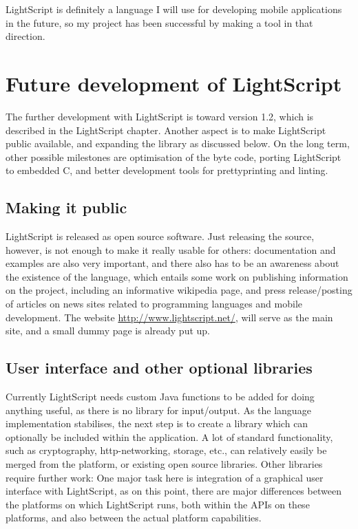 \documentclass[11pt]{report}
\begin{document}
LightScript is definitely a language I will use for developing mobile applications in the future, so my project has been successful by making a tool in that direction.

\section{Future development of LightScript}

The further development with LightScript is toward version 1.2, which is described in the LightScript chapter. Another aspect is to make LightScript public available, and expanding the library as discussed below.
On the long term, other possible milestones are optimisation of the byte code, porting LightScript to embedded C, and better development tools for prettyprinting and linting.

\subsection{Making it public}
LightScript is released as open source software. 
Just releasing the source, however, is not enough to make it really usable for others: documentation and examples are also very important, and there also has to be an awareness about the existence of the language, which entails some work on publishing information on the project, including an informative wikipedia page, and press release/posting of articles on news sites related to programming languages and mobile development.
The website \url{http://www.lightscript.net/}, will serve as the main site, and a small dummy page is already put up.

\subsection{User interface and other optional libraries}
Currently LightScript needs custom Java functions to be added for doing anything useful, as there is no library for input/output.
As the language implementation stabilises, the next step is to create a library which can optionally be included within the application.
A lot of standard functionality, such as cryptography, http-networking, storage, etc.,  can relatively easily be merged from the platform, or existing open source libraries. 
Other libraries require further work: One major task here is integration of a graphical user interface with LightScript, as on this point, there are major differences between the platforms on which LightScript runs, both within the APIs on these platforms, and also between the actual platform capabilities.
\end{document}
